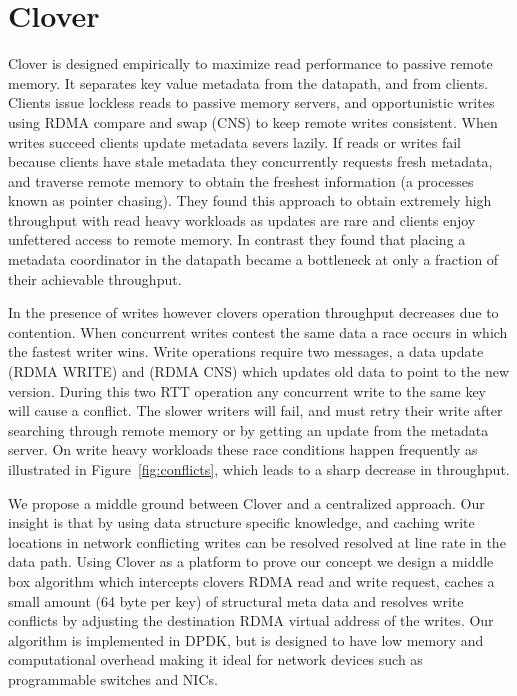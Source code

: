 \section{Clover}


Clover is designed empirically to maximize read performance to passive
remote memory. It separates key value metadata from the datapath, and
from clients. Clients issue lockless reads to passive memory servers,
and opportunistic writes using RDMA compare and swap (CNS) to keep
remote writes consistent. When writes succeed clients update metadata
severs lazily. If reads or writes fail because clients have stale
metadata they concurrently requests fresh metadata, and traverse
remote memory to obtain the freshest information (a processes known as
pointer chasing). They found this approach to obtain extremely high
throughput with read heavy workloads as updates are rare and clients
enjoy unfettered access to remote memory. In contrast they found that
placing a metadata coordinator in the datapath became a bottleneck at
only a fraction of their achievable throughput.


In the presence of writes however clovers operation throughput
decreases due to contention. When concurrent writes contest the same
data a race occurs in which the fastest writer wins. Write operations
require two messages, a data update (RDMA WRITE) and (RDMA CNS) which
updates old data to point to the new version. During this two RTT
operation any concurrent write to the same key will cause a conflict.
The slower writers will fail, and must retry their write after
searching through remote memory or by getting an update from the
metadata server.  On write heavy workloads these race conditions
happen frequently as illustrated in Figure~\ref{fig:conflicts}, which
leads to a sharp decrease in throughput.

We propose a middle ground between Clover and a centralized approach.
Our insight is that by using data structure specific knowledge, and
caching write locations in network conflicting writes can be resolved
resolved at line rate in the data path.  Using Clover as a platform to
prove our concept we design a middle box algorithm which intercepts
clovers RDMA read and write request, caches a small amount (64 byte
per key) of structural meta data and resolves write conflicts by
adjusting the destination RDMA virtual address of the writes. Our
algorithm is implemented in DPDK, but is designed to have low memory
and computational overhead making it ideal for network devices such as
programmable switches and NICs.




